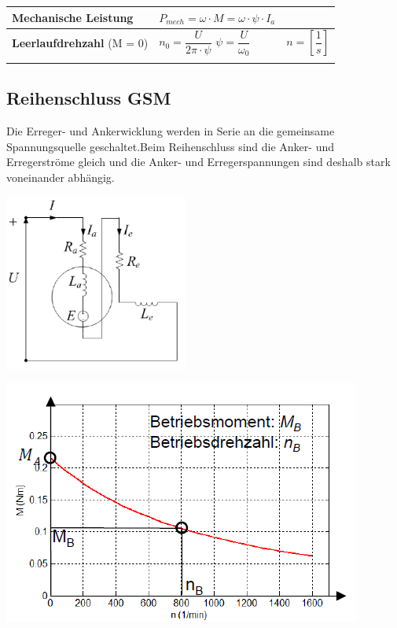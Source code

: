 \begin{longtable}{| p{} | p{} | p{} |}
    	\textbf{Mechanische Leistung} &
        $P_{mech} = \omega\cdot M = \omega\cdot\psi\cdot I_a$ &
        \\ \hline
        
    	\textbf{Leerlaufdrehzahl}\newline\newline
        (M = 0)&
        $n_0 = \dfrac{U}{2\pi\cdot\psi}$\newline
        $ \psi = \dfrac{U}{\omega_0} $&
        $n = \left[\dfrac{1}{s}\right]$
        \\ \lasthline
    \end{longtable}
    \clearpage
    \newpage

\subsection{Reihenschluss GSM}
    Die Erreger- und Ankerwicklung werden in Serie an die gemeinsame Spannungsquelle geschaltet.\newline Beim Reihenschluss sind die Anker- und Erregerströme gleich und die Anker- und Erregerspannungen sind deshalb  stark voneinander abhängig.\newline
    \begin{minipage}[b]{0.4\textwidth}
    	\raggedright
    	\includegraphics[width=6cm]{images/Reihenschluss.png}
    \end{minipage}
    \begin{minipage}[b]{0.5\textwidth}
    	\raggedright
    	\includegraphics[scale = 0.8]{images/KennlinieReihenschluss1}
    \end{minipage}\\
